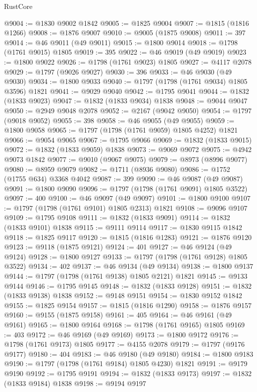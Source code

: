 \begin{lexlean}{RustCore}
\begin{coremodule}
@9004 := @1830 @9002 @1842
@9005 := @1825 @9004
@9007 := @1815 (@1816 @1266)
@9008 := @1876 @9007
@9010 := @9005 (@1875 @9008)
@9011 := 397
@9014 := @46 @9011 (@49 @9011)
@9015 := @1800 @9014
@9018 := @1798 (@1761 @9015) @1805
@9019 := 395
@9022 := @46 @9019 (@49 @9019)
@9023 := @1800 @9022
@9026 := @1798 (@1761 @9023) @1805
@9027 := @4117 @2078
@9029 := @1797 (@9026 @9027)
@9030 := 396
@9033 := @46 @9030 (@49 @9030)
@9034 := @1800 @9033
@9040 := @1797 (@1798 (@1761 @9034) @1805 @3596) @1821
@9041 := @9029 @9040
@9042 := @1795 @9041
@9044 := @1832 (@1833 @9023)
@9047 := @1832 (@1833 @9034) @1838
@9048 := @9044 @9047
@9050 := @2949 @9048 @2078
@9052 := @2167 (@9042 @9050)
@9054 := @1797 (@9018 @9052)
@9055 := 398
@9058 := @46 @9055 (@49 @9055)
@9059 := @1800 @9058
@9065 := @1797 (@1798 (@1761 @9059) @1805 @4252) @1821
@9066 := @9054 @9065
@9067 := @1795 @9066
@9069 := @1832 (@1833 @9015)
@9072 := @1832 (@1833 @9059) @1838
@9073 := @9069 @9072
@9075 := @4942 @9073 @1842
@9077 := @9010 (@9067 @9075)
@9079 := @8973 (@8996 @9077)
@9080 := @8959 @9079
@9082 := @1711 (@8936 @9080)
@9086 := @1752 (@1755 @634) @3368 @4042
@9087 := 399
@9090 := @46 @9087 (@49 @9087)
@9091 := @1800 @9090
@9096 := @1797 (@1798 (@1761 @9091) @1805 @3522)
@9097 := 400
@9100 := @46 @9097 (@49 @9097)
@9101 := @1800 @9100
@9107 := @1797 (@1798 (@1761 @9101) @1805 @2313) @1821
@9108 := @9096 @9107
@9109 := @1795 @9108
@9111 := @1832 (@1833 @9091)
@9114 := @1832 (@1833 @9101) @1838
@9115 := @9111 @9114
@9117 := @1830 @9115 @1842
@9118 := @1825 @9117
@9120 := @1815 (@1816 @1283)
@9121 := @1876 @9120
@9123 := @9118 (@1875 @9121)
@9124 := 401
@9127 := @46 @9124 (@49 @9124)
@9128 := @1800 @9127
@9133 := @1797 (@1798 (@1761 @9128) @1805 @3522)
@9134 := 402
@9137 := @46 @9134 (@49 @9134)
@9138 := @1800 @9137
@9144 := @1797 (@1798 (@1761 @9138) @1805 @2121) @1821
@9145 := @9133 @9144
@9146 := @1795 @9145
@9148 := @1832 (@1833 @9128)
@9151 := @1832 (@1833 @9138) @1838
@9152 := @9148 @9151
@9154 := @1830 @9152 @1842
@9155 := @1825 @9154
@9157 := @1815 (@1816 @1290)
@9158 := @1876 @9157
@9160 := @9155 (@1875 @9158)
@9161 := 405
@9164 := @46 @9161 (@49 @9161)
@9165 := @1800 @9164
@9168 := @1798 (@1761 @9165) @1805
@9169 := 403
@9172 := @46 @9169 (@49 @9169)
@9173 := @1800 @9172
@9176 := @1798 (@1761 @9173) @1805
@9177 := @4155 @2078
@9179 := @1797 (@9176 @9177)
@9180 := 404
@9183 := @46 @9180 (@49 @9180)
@9184 := @1800 @9183
@9190 := @1797 (@1798 (@1761 @9184) @1805 @4230) @1821
@9191 := @9179 @9190
@9192 := @1795 @9191
@9194 := @1832 (@1833 @9173)
@9197 := @1832 (@1833 @9184) @1838
@9198 := @9194 @9197

\end{coremodule}
\end{lexlean}
